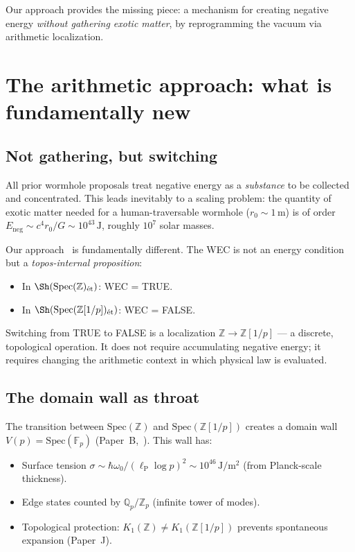 \documentclass[11pt,a4paper]{article}
\newcommand{\Spec}{\mathrm{Spec}}
\newcommand{\Zp}{\mathbb{Z}[1/p]}
\newcommand{\lP}{\ell_{\mathrm{P}}}
\begin{document}
Our approach provides the missing piece: a mechanism for creating
negative energy \emph{without gathering exotic matter}, by
reprogramming the vacuum via arithmetic localization.

\section{The arithmetic approach: what is fundamentally new}
\label{sec:new}

\subsection{Not gathering, but switching}

All prior wormhole proposals treat negative energy as a
\emph{substance} to be collected and concentrated. This leads
inevitably to a scaling problem: the quantity of exotic matter
needed for a human-traversable wormhole ($r_0 \sim 1\,\mathrm{m}$)
is of order $E_{\mathrm{neg}} \sim c^4 r_0 / G \sim 10^{43}\,\mathrm{J}$,
roughly $10^7$ solar masses.

Our approach~\cite{paper_A,paper_B} is fundamentally different.
The WEC is not an energy condition but a \emph{topos-internal
proposition}:
\begin{itemize}
\item In $\Sh(\Spec(\mathbb{Z})_{\mathrm{\acute{e}t}})$: WEC = TRUE.
\item In $\Sh(\Spec(\Zp)_{\mathrm{\acute{e}t}})$: WEC = FALSE.
\end{itemize}

Switching from TRUE to FALSE is a localization
$\mathbb{Z} \to \Zp$ --- a discrete, topological operation.
It does not require accumulating negative energy; it requires
changing the arithmetic context in which physical law is evaluated.

\subsection{The domain wall as throat}

The transition between $\Spec(\mathbb{Z})$ and $\Spec(\Zp)$
creates a domain wall $V(p) = \Spec(\mathbb{F}_p)$
(Paper~B,~\cite{paper_B}). This wall has:
\begin{itemize}
\item Surface tension $\sigma \sim \hbar\omega_0 / (\lP \log p)^2
  \sim 10^{46}\,\mathrm{J/m^2}$ (from Planck-scale thickness).
\item Edge states counted by $\mathbb{Q}_p/\mathbb{Z}_p$
  (infinite tower of modes).
\item Topological protection: $K_1(\mathbb{Z}) \neq K_1(\Zp)$
  prevents spontaneous expansion (Paper~J).
\end{itemize}
\end{document}
